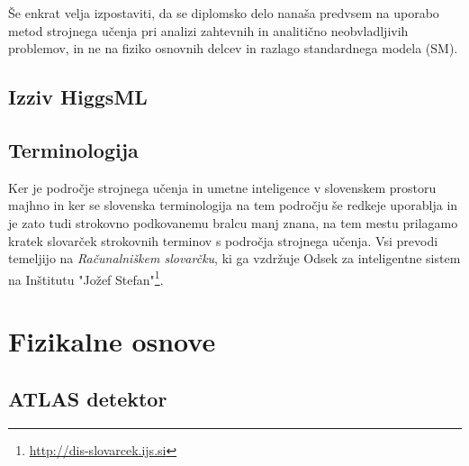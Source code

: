 \documentclass[11pt,a4paper,openany]{book}
\begin{document}
Še enkrat velja izpostaviti, da se diplomsko delo nanaša predvsem na uporabo metod strojnega učenja pri analizi zahtevnih in analitično neobvladljivih problemov, in ne na fiziko osnovnih delcev in razlago standardnega modela (SM).


\section*{Izziv HiggsML}


\section*{Terminologija}

Ker je področje strojnega učenja in umetne inteligence v slovenskem prostoru majhno in ker se slovenska terminologija na tem področju še redkeje uporablja in je zato tudi strokovno podkovanemu bralcu manj znana, na tem mestu prilagamo kratek slovarček strokovnih terminov s področja strojnega učenja. Vsi prevodi temeljijo na \textit{Računalniškem slovarčku}, ki ga vzdržuje Odsek za inteligentne sistem na Inštitutu "Jožef Stefan"\footnote{\url{http://dis-slovarcek.ijs.si}}.



\chapter{Fizikalne osnove}




\section{ATLAS detektor}
\end{document}

